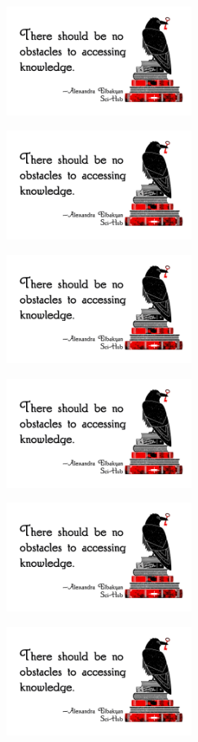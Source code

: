 \documentclass[a4paper,14pt]{extarticle}
\begin{document}
\vspace{2mm}



\parbox[c][34mm]{70mm}{\includegraphics[width=60mm]{obstacles-sticker} }
\parbox[c][34mm]{70mm}{\includegraphics[width=60mm]{obstacles-sticker} }
\parbox[c][34mm]{70mm}{\includegraphics[width=60mm]{obstacles-sticker} }


\vspace{4mm}


\parbox[c][34mm]{70mm}{\includegraphics[width=60mm]{obstacles-sticker} }
\parbox[c][34mm]{70mm}{\includegraphics[width=60mm]{obstacles-sticker} }
\parbox[c][34mm]{70mm}{\includegraphics[width=60mm]{obstacles-sticker} }
\end{document}
